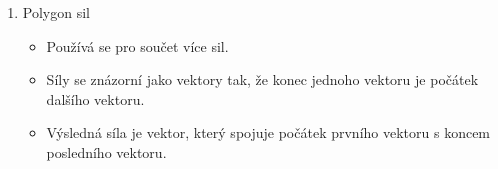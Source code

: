 \documentclass[letterpaper,10pt,english]{jupyterBook}
\begin{document}
\begin{itemize}
\begin{enumerate}
\end{enumerate}

\sphinxAtStartPar
{}
\begin{enumerate}
%
\setcounter{enumi}{3}
\item {} 
\sphinxAtStartPar
Polygon sil
\begin{itemize}
\item {} 
\sphinxAtStartPar
Používá se pro součet více sil.

\item {} 
\sphinxAtStartPar
Síly se znázorní jako vektory tak, že konec jednoho vektoru je počátek dalšího vektoru.

\item {} 
\sphinxAtStartPar
Výsledná síla je vektor, který spojuje počátek prvního vektoru s koncem posledního vektoru.

\end{itemize}

\end{enumerate}

\end{itemize}

\sphinxAtStartPar
{}
\end{document}

